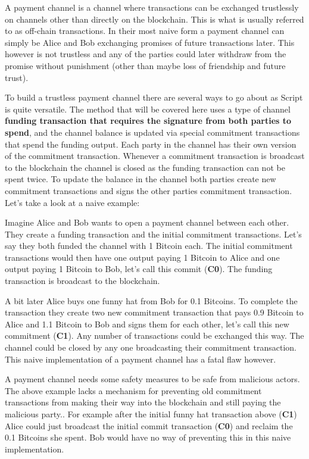
A payment channel is a channel where transactions can be exchanged trustlessly on channels other than directly on the blockchain.
This is what is usually referred to as off-chain transactions.
In their most naive form a payment channel can simply be Alice and Bob exchanging promises of future transactions later.
This however is not trustless and any of the parties could later withdraw from the promise without punishment (other than maybe loss of friendship and future trust).

To build a trustless payment channel there are several ways to go about as Script is quite versatile.
The method that will be covered here uses a type of channel \textbf{funding transaction that requires the signature from both parties to spend}, and the channel balance is updated via special commitment transactions that spend the funding output. Each party in the channel has their own version of the commitment transaction. Whenever a commitment transaction is broadcast to the blockchain the channel is closed as the funding transaction can not be spent twice. To update the balance in the channel both parties create new commitment transactions and signs the other parties commitment transaction.\cite{lightningnetwork_2019}\cite{antonopoulos_2017}
Let's take a look at a naive example:

Imagine Alice and Bob wants to open a payment channel between each other. They create a funding transaction and the initial commitment transactions. Let's say they both funded the channel with 1 Bitcoin each. The initial commitment transactions would then have one output paying 1 Bitcoin to Alice and one output paying 1 Bitcoin to Bob, let's call this commit (\textbf{C0}).
The funding transaction is broadcast to the blockchain.

A bit later Alice buys one funny hat from Bob for 0.1 Bitcoins. To complete the transaction they create two new commitment transaction that pays 0.9 Bitcoin to Alice and 1.1 Bitcoin to Bob and signs them for each other, let's call this new commitment (\textbf{C1}). Any number of transactions could be exchanged this way. The channel could be closed by any one broadcasting their commitment transaction. This naive implementation of a payment channel has a fatal flaw however. 

A payment channel needs some safety measures to be safe from malicious actors. The above example lacks a mechanism for preventing old commitment transactions from making their way into the blockchain and still paying the malicious party.. For example after the initial funny hat transaction above (\textbf{C1}) Alice could just broadcast the initial commit transaction (\textbf{C0}) and reclaim the 0.1 Bitcoins she spent. Bob would have no way of preventing this in this naive implementation.

